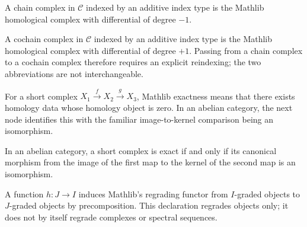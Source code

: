 \begin{definition}
  \label{def:mathlib-chain-complex}
  \mathlibok
  A chain complex in $\mathcal C$ indexed by an additive index type is the
  Mathlib homological complex with differential of degree $-1$.
\end{definition}

\begin{definition}
  \label{def:mathlib-cochain-complex}
  \mathlibok
  A cochain complex in $\mathcal C$ indexed by an additive index type is the
  Mathlib homological complex with differential of degree $+1$.  Passing from a
  chain complex to a cochain complex therefore requires an explicit reindexing;
  the two abbreviations are not interchangeable.
\end{definition}

\begin{definition}
  \label{def:mathlib-short-complex-exact}
  \mathlibok
  For a short complex $X_1\xrightarrow{f}X_2\xrightarrow{g}X_3$, Mathlib
  exactness means that there exists homology data whose homology object is
  zero.  In an abelian category, the next node identifies this with the
  familiar image-to-kernel comparison being an isomorphism.
\end{definition}

\begin{theorem}
  \label{thm:mathlib-exact-iff-image-kernel}
  \mathlibok
  In an abelian category, a short complex is exact if and only if its canonical
  morphism from the image of the first map to the kernel of the second map is
  an isomorphism.
\end{theorem}

\begin{definition}
  \label{def:mathlib-graded-comap}
  \mathlibok
  A function $h:J\to I$ induces Mathlib's regrading functor from
  $I$-graded objects to $J$-graded objects by precomposition.  This declaration
  regrades objects only; it does not by itself regrade complexes or spectral
  sequences.
\end{definition}

